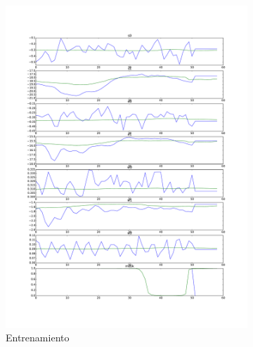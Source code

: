 \begin{figure}[hbt]
	\begin{subfigure}{0.3\textwidth}
		\centering
		\includegraphics[width=\linewidth]{imagenes/resultados/pred_train.pdf}
		\caption{Entrenamiento}
		\label{fig:resultados/pred_train}
	\end{subfigure}
	\begin{subfigure}{0.3\textwidth}
		\centering

\end{subfigure}
\end{figure}
